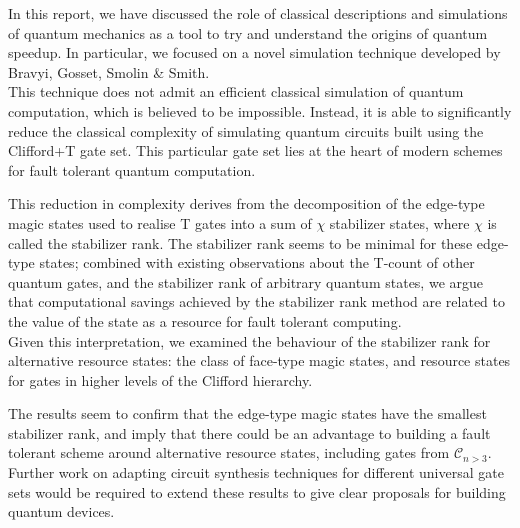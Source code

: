 \documentclass{standalone}
\begin{document}
In this report, we have discussed the role of classical descriptions and simulations of quantum mechanics as a tool to try and understand the origins of quantum speedup. In particular, we focused on a novel simulation technique developed by Bravyi, Gosset, Smolin \& Smith. \\
This technique does not admit an efficient classical simulation of quantum computation, which is believed to be impossible. Instead, it is able to significantly reduce the classical complexity of simulating quantum circuits built using the Clifford+T gate set. This particular gate set lies at the heart of modern schemes for fault tolerant quantum computation.
\par
This reduction in complexity derives from the decomposition of the edge-type magic states used to realise T gates into a sum of $\chi$ stabilizer states, where $\chi$ is called the stabilizer rank. The stabilizer rank seems to be minimal for these edge-type states; combined with existing observations about the T-count of other quantum gates, and the stabilizer rank of arbitrary quantum states, we argue that computational savings achieved by the stabilizer rank method are related to the value of the state as a resource for fault tolerant computing.\\
Given this interpretation, we examined the behaviour of the stabilizer rank for alternative resource states: the class of face-type magic states, and resource states for gates in higher levels of the Clifford hierarchy. 
\par
The results seem to confirm that the edge-type magic states have the smallest stabilizer rank, and imply that there could be an advantage to building a fault tolerant scheme around alternative resource states, including gates from $\mathcal{C}_{n>3}$. Further work on adapting circuit synthesis techniques for different universal gate sets would be required to extend these results to give clear proposals for building quantum devices. 
\end{document}
